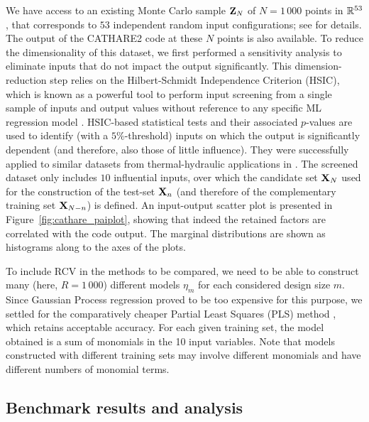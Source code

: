 We have access to an existing Monte Carlo sample ${\bf Z}_N$ of $N=1\,000$ points in $\mathbb{R}^{53}$, that corresponds to $53$ independent random input configurations; see \cite{ioobou10} for details. The output  of  the  CATHARE2 code  at these $N$ points is also available. To reduce the dimensionality of this dataset, we first performed a sensitivity analysis \cite{davgam21} to eliminate inputs that do not impact the output significantly. This dimension-reduction step relies on the Hilbert-Schmidt Independence Criterion (HSIC), which is known as a powerful tool to perform input screening from a single sample of inputs and output values without reference to any specific ML regression model \cite{grebou05,dav15}.
HSIC-based statistical tests and their associated $p$-values are used to identify (with a $5\%$-threshold) inputs on which the output is significantly dependent (and therefore, also those of little influence). They were successfully applied to similar datasets from thermal-hydraulic applications in \cite{marcha21,marioo21}.
The screened dataset only includes $10$ influential inputs, over which the candidate set ${\bf X}_N$ used for the construction of the test-set ${\bf X}_n$ (and therefore of the complementary training set ${\bf X}_{N-n}$) is defined. 
An input-output scatter plot is presented in Figure~\ref{fig:cathare_paiplot}, %
showing that indeed the retained factors are correlated with the code output. The marginal distributions are shown as histograms along to the axes of the plots.

To include RCV in the methods to be compared, we need to be able to construct many (here, $R=1\,000$) different models $\eta_m$ for each considered design size $m$.
Since Gaussian Process regression proved to be too expensive for this purpose, we settled for the  comparatively cheaper Partial Least Squares (PLS) method \cite{wolsjo01}, which retains acceptable accuracy.
For each given training set, the model obtained is a sum of monomials in the 10 input variables. Note that models constructed with different training sets may involve different monomials and have different numbers of monomial terms. 



\subsection{Benchmark results and analysis}

